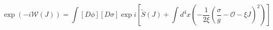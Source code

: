 \begin{equation}  \label{20}
\exp(-i\mathcal{W}(J))=\int[D\phi][D\sigma]\exp i\left[\widetilde{S}(J)+\int
d^{4}x\left(-\frac{1}{2\xi}\left(\frac{\sigma}{g}-\mathcal{O}-\xi
J\right)^{2}\right)\right]
\end{equation}

